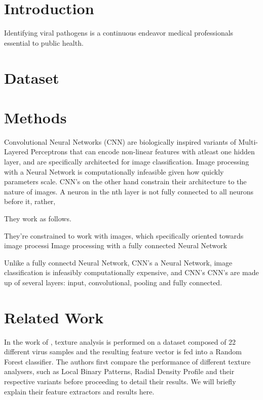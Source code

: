\begin{multicols}{2}
\section{Introduction}
Identifying viral pathogens is a continuous endeavor medical professionals  essential to public health. 

\section{Dataset}
\label{text:dataset}


\section{Methods}
Convolutional Neural Networks (CNN) are biologically inspired variants of Multi-Layered Perceptrons that can encode non-linear features with atleast one hidden layer, and are specifically architected for image classification. Image processing with a Neural Network is computationally infeasible given how quickly parameters scale. CNN's on the other hand constrain their architecture to the nature of images. A neuron in the nth layer is not fully connected to all neurons before it, rather, 


They work as follows. 

 They're constrained to work with images, which specifically oriented towards image processi Image processing with a fully connected Neural Network 

Unlike a fully connectd Neural Network, CNN's  a Neural Network, image classification is infeasibly computationally expensive, and CNN's  CNN's are made up of several layers: input, convolutional, pooling and fully connected.  

\section{Related Work}
In the work of \citet{kylberg2011virus}, texture analysis is performed on a dataset composed of 22 different  virus samples and the resulting feature vector is fed into a Random Forest classifier. The authors first compare the performance of different texture analysers, such as Local Binary Patterns, Radial Density Profile and their respective variants before proceeding to detail their results. We will briefly explain their feature extractors and results here. 

\end{multicols}
